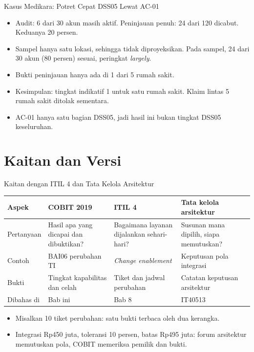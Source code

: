 \documentclass[aspectratio=169, table, 12pt]{beamer}
\begin{document}
\begin{frame}{{\Large Kasus Medikara: Potret Cepat DSS05 Lewat AC-01}}
  \vspace{4pt}
  \small
  \begin{itemize}
    \item Audit: 6 dari 30 akun masih aktif. Peninjauan penuh: 24 dari 120 dicabut. Keduanya 20 persen.
    \item Sampel hanya satu lokasi, sehingga tidak diproyeksikan. Pada sampel, 24 dari 30 akun (80 persen) sesuai, peringkat \textit{largely}.
    \item Bukti peninjauan hanya ada di 1 dari 5 rumah sakit.
    \item Kesimpulan: tingkat indikatif 1 untuk satu rumah sakit. Klaim lintas 5 rumah sakit ditolak sementara.
    \item AC-01 hanya satu bagian DSS05, jadi hasil ini bukan tingkat DSS05 keseluruhan.
  \end{itemize}
\end{frame}

\section{Kaitan dan Versi}

\begin{frame}{{\Large Kaitan dengan ITIL 4 dan Tata Kelola Arsitektur}}
  \vspace{2pt}
  \scriptsize
  \begin{tabularx}{\textwidth}{|>{\raggedright\arraybackslash}p{}|>{\raggedright\arraybackslash}X|>{\raggedright\arraybackslash}X|>{\raggedright\arraybackslash}X|}
    \hline
    \textbf{Aspek} & \textbf{COBIT 2019} & \textbf{ITIL 4} & \textbf{Tata kelola arsitektur} \\ \hline
    Pertanyaan & Hasil apa yang dicapai dan dibuktikan? & Bagaimana layanan dijalankan sehari-hari? & Susunan mana dipilih, siapa memutuskan? \\ \hline
    Contoh & BAI06 perubahan TI & \textit{Change enablement} & Keputusan pola integrasi \\ \hline
    Bukti & Tingkat kapabilitas dan celah & Tiket dan jadwal perubahan & Catatan keputusan arsitektur \\ \hline
    Dibahas di & Bab ini & Bab 8 & IT40513 \\ \hline
  \end{tabularx}

  \vspace{6pt}
  \small
  \begin{itemize}
    \item Misalkan 10 tiket perubahan: satu bukti terbaca oleh dua kerangka.
    \item Integrasi Rp450 juta, toleransi 10 persen, batas Rp495 juta: forum arsitektur memutuskan pola, COBIT memeriksa pemilik dan bukti.
  \end{itemize}
\end{frame}
\end{document}
